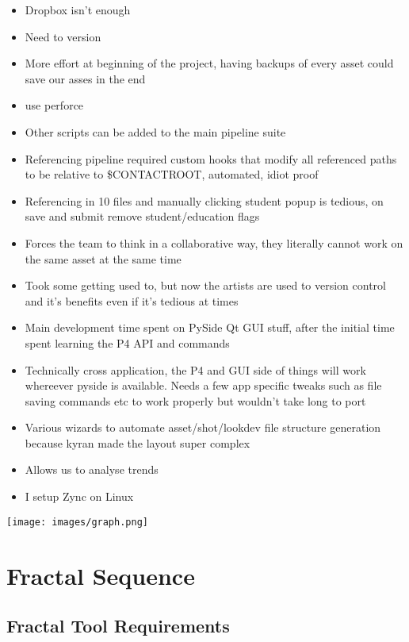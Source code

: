 \documentclass[11pt,a4paper,final,notitlepage]{report}
\begin{document}
\begin{itemize}
	\item Dropbox isn't enough
	\item Need to version
	\item More effort at beginning of the project, having backups of every asset could save our asses in the end
	\item use perforce
	\item Other scripts can be added to the main pipeline suite
	\item Referencing pipeline required custom hooks that modify all referenced paths to be relative to \$CONTACTROOT, automated, idiot proof
	\item Referencing in 10 files and manually clicking student popup is tedious, on save and submit remove student/education flags
	\item Forces the team to think in a collaborative way, they literally cannot work on the same asset at the same time
	\item Took some getting used to, but now the artists are used to version control and it's benefits even if it's tedious at times
	\item Main development time spent on PySide Qt GUI stuff, after the initial time spent learning the P4 API and commands
	\item Technically cross application, the P4 and GUI side of things will work whereever pyside is available. Needs a few app specific tweaks such as file saving commands etc to work properly but wouldn't take long to port
	\item Various wizards to automate asset/shot/lookdev file structure generation because kyran made the layout super complex
	\item Allows us to analyse trends
	\item I setup Zync on Linux
\end{itemize}


\texttt{[image: images/graph.png]}





\chapter{Fractal Sequence}



\section{Fractal Tool Requirements}
\end{document}
